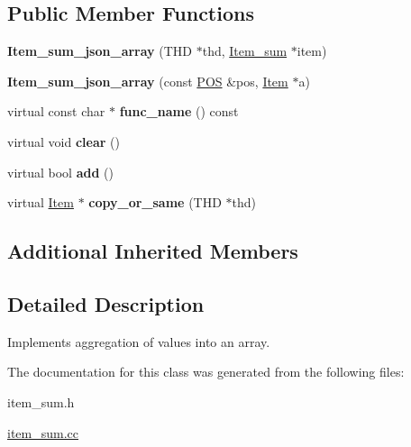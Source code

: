 \subsection*{Public Member Functions}
\begin{DoxyCompactItemize}
\item 
\mbox{\label{classItem__sum__json__array_a612471ca982905dae01fffc018627eb1}} 
{\bfseries Item\+\_\+sum\+\_\+json\+\_\+array} (T\+HD $\ast$thd, \mbox{\hyperlink{classItem__sum}{Item\+\_\+sum}} $\ast$item)
\item 
\mbox{\label{classItem__sum__json__array_a62145501a081a612326a34d97dcb8a86}} 
{\bfseries Item\+\_\+sum\+\_\+json\+\_\+array} (const \mbox{\hyperlink{structYYLTYPE}{P\+OS}} \&pos, \mbox{\hyperlink{classItem}{Item}} $\ast$a)
\item 
\mbox{\label{classItem__sum__json__array_a2af8672f05c124046aa62515d7ea349d}} 
virtual const char $\ast$ {\bfseries func\+\_\+name} () const
\item 
\mbox{\label{classItem__sum__json__array_aa205de4e875a918760955aa0d180ae0b}} 
virtual void {\bfseries clear} ()
\item 
\mbox{\label{classItem__sum__json__array_a99cca72042dc971fe20ac759d3c8a8a7}} 
virtual bool {\bfseries add} ()
\item 
\mbox{\label{classItem__sum__json__array_a06e4ef9bf43f3e433a2f27f1a19525f3}} 
virtual \mbox{\hyperlink{classItem}{Item}} $\ast$ {\bfseries copy\+\_\+or\+\_\+same} (T\+HD $\ast$thd)
\end{DoxyCompactItemize}
\subsection*{Additional Inherited Members}


\subsection{Detailed Description}
Implements aggregation of values into an array. 

The documentation for this class was generated from the following files\+:\begin{DoxyCompactItemize}
\item 
item\+\_\+sum.\+h\item 
\mbox{\hyperlink{item__sum_8cc}{item\+\_\+sum.\+cc}}\end{DoxyCompactItemize}
